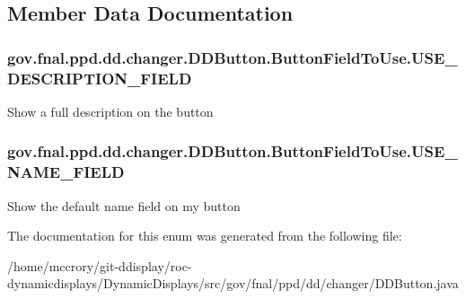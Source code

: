\subsection{Member Data Documentation}
\hypertarget{enumgov_1_1fnal_1_1ppd_1_1dd_1_1changer_1_1DDButton_1_1ButtonFieldToUse_a49d0f646fba74578ef1a73a09c0c943b}{
\subsubsection[{U\-S\-E\-\_\-\-D\-E\-S\-C\-R\-I\-P\-T\-I\-O\-N\-\_\-\-F\-I\-E\-L\-D}]{\setlength{\rightskip}{0pt plus 5cm}gov.\-fnal.\-ppd.\-dd.\-changer.\-D\-D\-Button.\-Button\-Field\-To\-Use.\-U\-S\-E\-\_\-\-D\-E\-S\-C\-R\-I\-P\-T\-I\-O\-N\-\_\-\-F\-I\-E\-L\-D}}\label{enumgov_1_1fnal_1_1ppd_1_1dd_1_1changer_1_1DDButton_1_1ButtonFieldToUse_a49d0f646fba74578ef1a73a09c0c943b}
Show a full description on the button \hypertarget{enumgov_1_1fnal_1_1ppd_1_1dd_1_1changer_1_1DDButton_1_1ButtonFieldToUse_a68754ca17fd3e4649184763d72308b13}{
\subsubsection[{U\-S\-E\-\_\-\-N\-A\-M\-E\-\_\-\-F\-I\-E\-L\-D}]{\setlength{\rightskip}{0pt plus 5cm}gov.\-fnal.\-ppd.\-dd.\-changer.\-D\-D\-Button.\-Button\-Field\-To\-Use.\-U\-S\-E\-\_\-\-N\-A\-M\-E\-\_\-\-F\-I\-E\-L\-D}}\label{enumgov_1_1fnal_1_1ppd_1_1dd_1_1changer_1_1DDButton_1_1ButtonFieldToUse_a68754ca17fd3e4649184763d72308b13}
Show the default name field on my button 

The documentation for this enum was generated from the following file\-:\begin{DoxyCompactItemize}
\item 
/home/mccrory/git-\/ddisplay/roc-\/dynamicdisplays/\-Dynamic\-Displays/src/gov/fnal/ppd/dd/changer/D\-D\-Button.\-java\end{DoxyCompactItemize}
